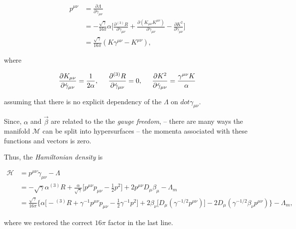 \begin{align}
p^{\mu\nu} &= \frac{\partial\Lambda}{\partial\dot{\gamma}_{\mu\nu}} \\
&= -\frac{\sqrt{\gamma}}{16\pi}\alpha\Bigg[\frac{\partial {^{(3)}R}}{\partial\dot{\gamma}_{\mu\nu}} + \frac{\partial(K_{\mu\nu}K^{\mu\nu})}{\partial\dot{\gamma}_{\mu\nu}} - \frac{\partial K^2}{\partial\dot{\gamma}_{\mu\nu}}\Bigg] \\
&= \frac{\sqrt{\gamma}}{16\pi}(K\gamma^{\mu\nu} - K^{\mu\nu}),
\end{align}

where 

\begin{equation}
\frac{\partial K_{\mu\nu}}{\partial \dot{\gamma}_{\mu\nu}} = \frac{1}{2\alpha}, \hspace{5mm} \frac{\partial {^{(3)}R}}{\partial \dot{\gamma}_{\mu\nu}} = 0, \hspace{5mm}\frac{\partial K^2}{\partial \dot{\gamma}_{\mu\nu}} = \frac{\gamma^{\mu\nu}K}{\alpha}
\end{equation}

assuming that there is no explicit dependency of the $\Lambda$ on $dot{\gamma}_{\mu\nu}$.

Since, $\alpha$ and $\vec{\beta}$ are related to the the \textit{gauge freedom}, -- there are many ways the manifold $\mathcal{M}$ can be split into hypersurfaces -- the momenta associated with these functions and vectors is zero.

Thus, the \textit{Hamiltonian density} is

\begin{align}
\mathcal{H} &= p^{\mu\nu}\dot{\gamma}_{\mu\nu} - \Lambda \\
&= -\sqrt{\gamma}\alpha{^{(3)}R} + \frac{\alpha}{\sqrt{\gamma}}\Big[p^{\mu\nu}p_{\mu\nu}-\frac{1}{2}p^2\Big] + 2p^{\mu\nu} D_{\mu}\beta_{\mu} -\Lambda_m \\
&= \frac{\sqrt{\gamma}}{16\pi}\Bigg\{\alpha\Big[ -{^{(3)}R} + \gamma^{-1}p^{\mu\nu}p_{\mu\nu}-\frac{1}{2}\gamma^{-1}p^2\Big] +  2\beta_{\nu}\Big[D_{\mu}(\gamma^{-1/2}p^{\mu\nu})\Big] - 2D_{\mu}(\gamma^{-1/2}\beta_{\nu}p^{\mu\nu}) \Bigg\} - \Lambda_m,
\end{align}

where we restored the correct $16\pi$ factor in the last line.

